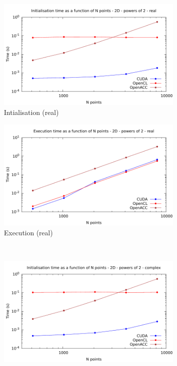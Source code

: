 \documentclass[12pt, a4paper]{article}
\begin{document}
\begin{figure}[H]
\captionsetup{width=0.8\linewidth}
\centering
\begin{subfigure}{.5\textwidth}
\centering
\includegraphics[width=.9\linewidth]{graphs/fft-2d-pow2-r-init.pdf}
\caption{Intialisation (real)}
\label{FFTPOW22DRI}
\end{subfigure}%
\begin{subfigure}{.5\textwidth}
\centering
\includegraphics[width=.9\linewidth]{graphs/fft-2d-pow2-r-exec.pdf}
\caption{Execution (real)}
\label{FFTPOW22DRE}
\end{subfigure}\\
\begin{subfigure}{.5\textwidth}
\centering
\includegraphics[width=.9\linewidth]{graphs/fft-2d-pow2-c-init.pdf}

\end{subfigure}
\end{figure}
\end{document}
